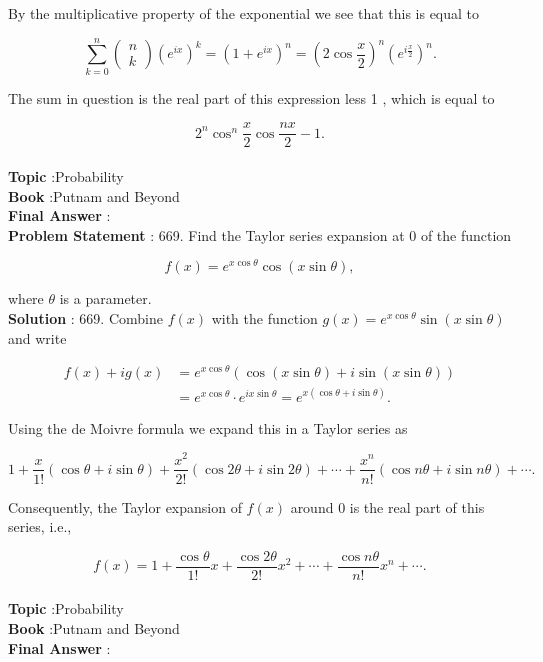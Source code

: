 \documentclass[10pt]{article}
\begin{document}
By the multiplicative property of the exponential we see that this is equal to

$$
\sum_{k=0}^{n}\left(\begin{array}{l}
n \\
k
\end{array}\right)\left(e^{i x}\right)^{k}=\left(1+e^{i x}\right)^{n}=\left(2 \cos \frac{x}{2}\right)^{n}\left(e^{i \frac{x}{2}}\right)^{n} .
$$

The sum in question is the real part of this expression less 1 , which is equal to

$$
2^{n} \cos ^{n} \frac{x}{2} \cos \frac{n x}{2}-1 .
$$
\\
\textbf{Topic} :Probability\\
\textbf{Book} :Putnam and Beyond\\
\textbf{Final Answer} :\\


\textbf{Problem Statement} :
669. Find the Taylor series expansion at 0 of the function

$$
f(x)=e^{x \cos \theta} \cos (x \sin \theta),
$$

where $\theta$ is a parameter.
\\
\textbf{Solution} :
669. Combine $f(x)$ with the function $g(x)=e^{x \cos \theta} \sin (x \sin \theta)$ and write

$$
\begin{aligned}
f(x)+i g(x) &=e^{x \cos \theta}(\cos (x \sin \theta)+i \sin (x \sin \theta)) \\
&=e^{x \cos \theta} \cdot e^{i x \sin \theta}=e^{x(\cos \theta+i \sin \theta)} .
\end{aligned}
$$

Using the de Moivre formula we expand this in a Taylor series as

$$
1+\frac{x}{1 !}(\cos \theta+i \sin \theta)+\frac{x^{2}}{2 !}(\cos 2 \theta+i \sin 2 \theta)+\cdots+\frac{x^{n}}{n !}(\cos n \theta+i \sin n \theta)+\cdots .
$$

Consequently, the Taylor expansion of $f(x)$ around 0 is the real part of this series, i.e.,

$$
f(x)=1+\frac{\cos \theta}{1 !} x+\frac{\cos 2 \theta}{2 !} x^{2}+\cdots+\frac{\cos n \theta}{n !} x^{n}+\cdots .
$$
\\
\textbf{Topic} :Probability\\
\textbf{Book} :Putnam and Beyond\\
\textbf{Final Answer} :\\
\end{document}

